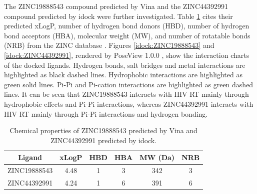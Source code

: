 The ZINC19888543 compound predicted by Vina and the ZINC44392991 compound predicted by idock were further investigated. Table \ref{idock:ZINC19888543-ZINC44392991} cites their predicted xLogP, number of hydrogen bond donors (HBD), number of hydrogen bond acceptors (HBA), molecular weight (MW), and number of rotatable bonds (NRB) from the ZINC database \citep{532,1178}. Figures \ref{idock:ZINC19888543} and \ref{idock:ZINC44392991}, rendered by PoseView 1.0.0 \citep{748}, show the interaction charts of the docked ligands. Hydrogen bonds, salt bridges and metal interactions are highlighted as black dashed lines. Hydrophobic interactions are highlighted as green solid lines. Pi-Pi and Pi-cation interactions are highlighted as green dashed lines. It can be seen that ZINC19888543 interacts with HIV RT mainly through hydrophobic effects and Pi-Pi interactions, whereas ZINC44392991 interacts with HIV RT mainly through Pi-Pi interactions and hydrogen bonding.

\begin{table}
\centering
\begin{tabular*}
{\linewidth}
{@{\extracolsep{\fill}}cccccc}
\toprule
Ligand & xLogP & HBD & HBA & MW (Da) & NRB\\
\midrule
ZINC19888543 & 4.48 & 1 & 3 & 342 & 3\\
ZINC44392991 & 4.24 & 1 & 6 & 391 & 6\\
\bottomrule
\end{tabular*}
\caption{Chemical properties of ZINC19888543 predicted by Vina and ZINC44392991 predicted by idock.}
\label{idock:ZINC19888543-ZINC44392991}
\end{table}

